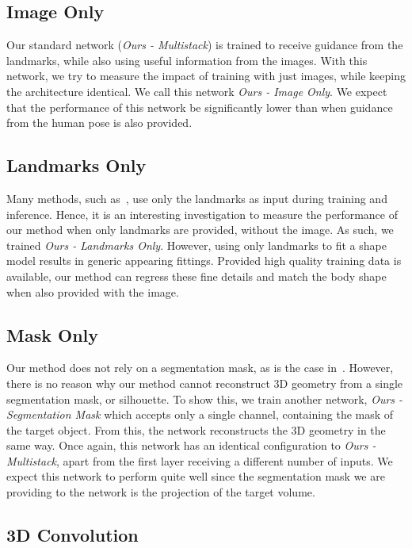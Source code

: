 \subsection{Image Only} %

Our standard network (\textit{Ours - Multistack}) is trained to
receive guidance from the landmarks, while also using useful
information from the images. With this network, we try to measure the
impact of training with just images, while keeping the architecture
identical. We call this network \textit{Ours - Image Only}. We expect
that the performance of this network be significantly lower than when
guidance from the human pose is also provided.

\subsection{Landmarks Only} %

Many methods, such
as~\cite{bogo2016smplify,ramakrishna2012reconstructing}, use only the
landmarks as input during training and inference. Hence, it is an
interesting investigation to measure the performance of our method
when only landmarks are provided, without the image. As such, we
trained \textit{Ours - Landmarks Only}. However, using only landmarks
to fit a shape model results in generic appearing fittings. Provided
high quality training data is available, our method can regress these
fine details and match the body shape when also provided with the
image.

\subsection{Mask Only}

Our method does not rely on a segmentation mask, as is the case
in~\cite{sigal2008combined}. However, there is no reason why our
method cannot reconstruct 3D geometry from a single segmentation mask,
or silhouette. To show this, we train another network, \textit{Ours -
  Segmentation Mask} which accepts only a single channel, containing
the mask of the target object. From this, the network reconstructs the
3D geometry in the same way. Once again, this network has an identical
configuration to \textit{Ours - Multistack}, apart from the first
layer receiving a different number of inputs. We expect this network
to perform quite well since the segmentation mask we are providing to
the network is the projection of the target volume.

\subsection{3D Convolution}

